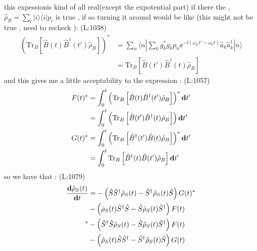  this expessionis kind of all real(except 
 the expotential part) if 
 there the , 
 $ \hat{\rho }_{B }=\sum _{i }|i \rangle \langle i |p _{i } $  is true 
 , if so turning it around would be like
(this might not be true , need to recheck ): 
(L:1038)
\begin{equation}
\begin{split}
\left(\text{Tr}_{B }\left[\hat{B }(t )\hat{B }^\dagger (t ')\hat{\rho }_{B }\right]\right)^*&=\sum _{n }\langle n |\sum _{k }g _{k }^*g _{k }p _{n }\ee ^{-\ii (\omega _{k '}t '-\omega _{k }t )}\hat{a }_{k }\hat{a }^\dagger _{k }|n \rangle \\
&=\text{Tr}_{B }\left[\hat{B }(t ')\hat{B }^\dagger (t )\hat{\rho }_{B }\right]\end{split}
\end{equation}
 and this gives me a little 
 acceptability to the expression : 
(L:1057)
\begin{equation}
\begin{split}
F (t )^*&=\int _{0}^{t }\left(\text{Tr}_{B }\left[\hat{B }(t )\hat{B }^\dagger (t ')\hat{\rho }_{B }\right]\right)^*\bold{d}t '\\
&=\int _{0}^{t }\left(\text{Tr}_{B }\left[\hat{B }(t ')\hat{B }^\dagger (t )\hat{\rho }_{B }\right]\right)\bold{d}t '\\
G (t )^*&=\int _{0}^{t }\left(\text{Tr}_{B }\left[\hat{B }^\dagger (t ')\hat{B }(t )\hat{\rho }_{B }\right]\right)^*\bold{d}t '\\
&=\int _{0}^{t }\text{Tr}_{B }\left[\hat{B }^\dagger (t )\hat{B }(t ')\hat{\rho }_{B }\right]\bold{d}t '\\
\end{split}
\end{equation}
 so we have that :
(L:1079)
\begin{equation}
\begin{split}
\label{sysRhoDerTime}\dfrac{\bold{d}\hat{\rho }_{S }(t )}{\bold{d}t }&=-\left(\hat{S }\hat{S }^\dagger \hat{\rho }_{S }(t )-\hat{S }^\dagger \hat{\rho }_{S }(t )\hat{S }\right)G (t )^*\\
&-\left(\hat{\rho }_{S }(t )\hat{S }^\dagger \hat{S }-\hat{S }\hat{\rho }_{S }(t )\hat{S }^\dagger \right)F (t )\\
^*&-\left(\hat{S }^\dagger \hat{S }\hat{\rho }_{S }(t )-\hat{S }\hat{\rho }_{S }(t )\hat{S }^\dagger \right)F (t )\\
&-\left(\hat{\rho }_{S }(t )\hat{S }\hat{S }^\dagger -\hat{S }^\dagger \hat{\rho }_{S }(t )\hat{S }\right)G (t )\end{split}
\end{equation}
